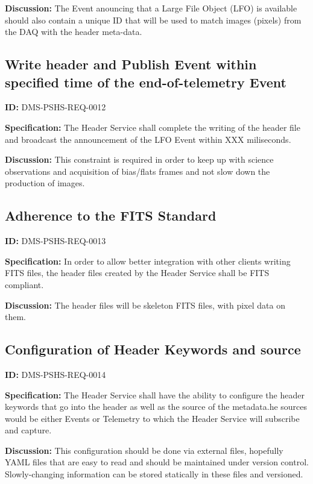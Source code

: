 \documentclass[SE,toc,lsstdraft]{lsstdoc}
\begin{document}
\textbf{Discussion:}
The Event anouncing that a Large File Object (LFO) is available should also contain a unique ID that will be used to match images (pixels) from the DAQ with the header meta-data.

\subsection{Write header and Publish Event within specified time of the end-of-telemetry Event}

\label{DMS-PSHS-REQ-0012}
\textbf{ID:} DMS-PSHS-REQ-0012

\textbf{Specification:}
The Header Service shall complete the writing of the header file and broadcast the announcement of the LFO Event within XXX miliseconds.

\textbf{Discussion:}
This constraint is required in order to keep up with science observations and acquisition of bias/flats frames and not slow down the production of images.

\subsection{Adherence to the FITS Standard}

\label{DMS-PSHS-REQ-0013}
\textbf{ID:} DMS-PSHS-REQ-0013

\textbf{Specification:}
In order to allow better integration with other clients writing FITS files, the header files created by the Header Service shall be FITS compliant.

\textbf{Discussion:}
The header files will be skeleton FITS files, with pixel data on them.

\subsection{Configuration of Header Keywords and source}

\label{DMS-PSHS-REQ-0014}
\textbf{ID:} DMS-PSHS-REQ-0014

\textbf{Specification:}
The Header Service shall have the ability to configure the header keywords that go into the header as well as the source of the metadata.he sources would be either Events or Telemetry to which the Header Service will subscribe and capture.

\textbf{Discussion:}
This configuration should be done via external files, hopefully YAML files that are easy to read and should be maintained under version control. Slowly-changing information can be stored statically in these files and versioned.
\end{document}
